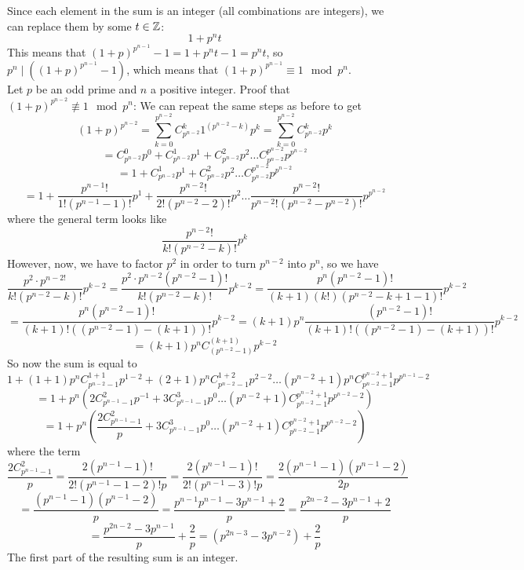\documentclass[12pt]{article}
\begin{document}
    Since each element in the sum is an integer
    (all combinations are integers),
    we can replace them by some $t \in \mathbb{Z}$:
    \[ 1 + p^nt\]
    This means that $(1 + p)^{p^{n-1}} - 1 = 1 + p^nt - 1
    = p^nt$,
    so $p^n \mid ((1 + p)^{p^{n-1}} - 1)$,
    which means that $(1 + p)^{p^{n-1}} \equiv 1 \mod p^n$. \\
    Let $p$ be an odd prime and $n$ a positive integer.
    Proof that $(1 + p)^{p^{n-2}} \not\equiv 1 \mod p^n$:
    We can repeat the same steps as before to get 
    \[ (1 + p)^{p^{n-2}}
    = \sum_{k = 0}^{p^{n-2}} C_{p^{n-2}}^{k}1^{(p^{n-2} - k)}p^k
    = \sum_{k = 0}^{p^{n-2}} C_{p^{n-2}}^{k}p^k \]
    \[ = C_{p^{n-2}}^0p^0 + C_{p^{n-2}}^1p^1 + C_{p^{n-2}}^2p^{2}
    \dots C_{p^{n-2}}^{p^{n-2}}p^{p^{n-2}} \]
    \[ = 1 + C_{p^{n-2}}^1p^1 + C_{p^{n-2}}^2p^2
    \dots C_{p^{n-2}}^{p^{n-2}}p^{p^{n-2}} \]
    \[ = 1 + \dfrac{p^{n-1}!}{1!(p^{n-1} - 1)!}p^1
    + \dfrac{p^{n-2}!}{2!(p^{n-2} - 2)!}p^2 \dots
    \dfrac{p^{n-2}!}{p^{n-2}!(p^{n-2} - p^{n-2})!}p^{p^{n-2}} \]
    where the general term looks like
    \[ \dfrac{p^{n-2}!}{k!(p^{n-2} - k)!}p^k \]
    However, now, we have to factor $p^2$ in order to turn
    $p^{n-2}$ into $p^n$, so we have
    \[ \dfrac{p^2 \cdot p^{n-2!}}{k!(p^{n-2} - k)!}p^{k-2}
    = \dfrac{p^2 \cdot p^{n-2}(p^{n-2} - 1)!}{k!(p^{n-2} - k)!}p^{k-2}
    = \dfrac{p^n(p^{n-2} - 1)!}{(k+1)(k!)(p^{n-2} - k + 1 - 1)!}p^{k-2} \]
    \[ = \dfrac{p^n(p^{n-2} - 1)!}{(k + 1)!((p^{n-2} - 1)-(k + 1))!}p^{k-2}
    = (k+1)p^n \dfrac{(p^{n-2}-1)!}{(k + 1)!((p^{n-2}-1)-(k + 1))!}p^{k-2} \]
    \[ = (k+1)p^n C_{(p^{n-2} - 1)}^{(k+1)} p^{k-2} \]
    So now the sum is equal to
    \[ 1 + (1 + 1)p^nC_{p^{n-2} - 1}^{1 + 1}p^{1-2}
    + (2+1)p^nC_{p^{n-2} - 1}^{1 + 2}p^{2-2} \dots
    (p^{n-2}+1)p^nC_{p^{n-2} - 1}^{p^{n-2} + 1}p^{p^{n-1}-2} \]
    \[ = 1 + p^n(2C_{p^{n-1} - 1}^{2}p^{-1}
    + 3C_{p^{n-1} - 1}^{3}p^{0} \dots
    (p^{n-2}+1)C_{p^{n-2} - 1}^{p^{n-2} + 1}p^{p^{n-2}-2}) \]
    \[ = 1 + p^n( \dfrac{2C_{p^{n-1} - 1}^{2}}{p}
    + 3C_{p^{n-1} - 1}^{3}p^{0} \dots
    (p^{n-2}+1)C_{p^{n-2} - 1}^{p^{n-2} + 1}p^{p^{n-2}-2}) \]
    where the term
    \[ \dfrac{2C_{p^{n-1} - 1}^{2}}{p}
    = \dfrac{2(p^{n-1} - 1)!}{2!(p^{n-1} - 1 - 2)!p} 
    = \dfrac{2(p^{n-1} - 1)!}{2!(p^{n-1} - 3)!p}
    = \dfrac{2(p^{n-1} - 1)(p^{n-1} - 2)}{2p} \]
    \[ = \dfrac{(p^{n-1} - 1)(p^{n-1} - 2)}{p}
    = \dfrac{p^{n-1}p^{n-1} - 3p^{n-1} + 2}{p}
    = \dfrac{p^{2n-2} - 3p^{n-1} + 2}{p} \]
    \[ = \dfrac{p^{2n-2} - 3p^{n-1}}{p} + \dfrac{2}{p} 
    = (p^{2n-3} - 3p^{n-2}) + \dfrac{2}{p} \]
    The first part of the resulting sum is an integer.
\end{document}
